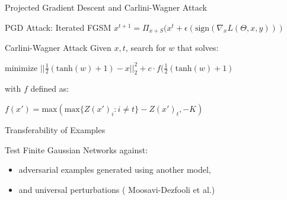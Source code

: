 \documentclass{beamer}
\begin{document}
\begin{frame}{Projected Gradient Descent and Carlini-Wagner Attack}
    \begin{block}{PGD Attack: Iterated FGSM}
    \centering $x^{t+1} = \Pi_{x+S}(x^t + \epsilon(\text{sign}(\nabla_x L(\Theta, x, y)  ))$
    \end{block}

    \begin{block}{Carlini-Wagner Attack}
    Given $x,t$, search for $w$ that solves:
    \begin{center}{minimize $||\frac{1}{2}(\text{tanh}(w)+1) -x||_2^2 + c \cdot f(\frac{1}{2}(\text{tanh}(w)+1) $} \end{center}
    with $f$ defined as:
    \begin{center}{$f(x') = \text{max}(\text{max}\{Z(x')_i : i\neq t\} - Z(x')_t, -K)$} \end{center}
    \cite{carlini2017evaluating} 
    \end{block}
\end{frame}

\begin{frame}{Transferability of Examples}
    
    Test Finite Gaussian Networks against:
    \begin{itemize}
        \item adversarial examples generated using another model,
        \item and universal perturbations (\cite{moosavidezfooli2017universal} Moosavi-Dezfooli et al.)
    \end{itemize}
    
\end{frame}
\end{document}
